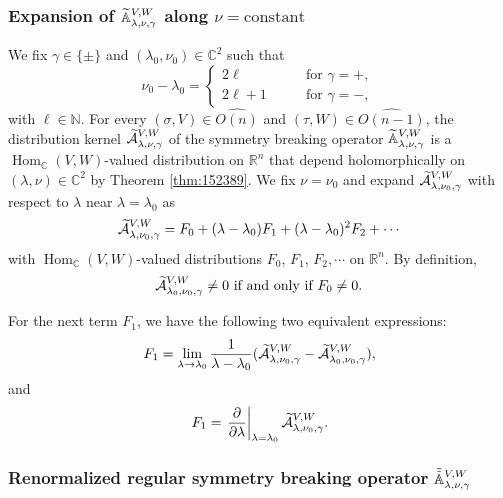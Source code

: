 \subsubsection{Expansion of ${\widetilde{\mathbb{A}}}_{{\lambda},{\nu},{\gamma}}^{{V, W}}$
 along $\nu=\text{constant}$}
\label{subsec:expand}
We fix $\gamma \in \{\pm\}$ and $(\lambda_0, \nu_0)\in {\mathbb{C}}^2$
 such that
\[
  \nu_0 - \lambda_0
  =
  \begin{cases}
  2\ell \qquad &\text{for $\gamma=+$, }
\\
  2\ell+1 \qquad &\text{for $\gamma=-$, }
  \end{cases}
\]
with $\ell \in {\mathbb{N}}$.  
For every $(\sigma, V) \in \widehat{O(n)}$ and $(\tau, W) \in \widehat{O(n-1)}$, the distribution kernel $\widetilde{{\mathcal{A}}}_{{\lambda},{\nu},{\gamma}}^{{V,W}}$
 of the symmetry breaking operator
 ${\widetilde{\mathbb{A}}}_{{\lambda},{\nu},{\gamma}}^{{V,W}}$ is
 a ${\operatorname{Hom}}_{\mathbb{C}}(V,W)$-valued
 distribution on ${\mathbb{R}}^n$
 that depend holomorphically on $(\lambda,\nu) \in {\mathbb{C}}^2$
 by Theorem \ref{thm:152389}.  
We fix $\nu=\nu_0$ and expand $\widetilde{{\mathcal{A}}}_{{\lambda},{\nu_0},{\gamma}}^{{V,W}}$
 with respect to $\lambda$ near $\lambda=\lambda_0$
 as 
\begin{equation}
\label{eqn:Anear0}
   \widetilde{{\mathcal{A}}}_{{\lambda},{\nu_0},{\gamma}}^{{V,W}}
   =
   F_0 + (\lambda-\lambda_0) F_1 + (\lambda-\lambda_0)^2 F_2 + \cdots
\end{equation}
 with ${\operatorname{Hom}}_{\mathbb{C}}(V,W)$-valued
 distributions $F_0$, $F_1$, $F_2, \cdots$
 on ${\mathbb{R}}^n$.  
By definition, 
\[
\text{
$\widetilde{{\mathcal{A}}}_{{\lambda_0},{\nu_0},{\gamma}}^{{V,W}} \ne 0$
 if and only if 
$F_0 \ne 0$.
}
\]



For the next term $F_1$, 
 we have the following two equivalent expressions:
\begin{equation}
\label{eqn:F1}
F_1
=
\lim_{\lambda \to \lambda_0}\frac 1 {\lambda-\lambda_0}
(\widetilde{{\mathcal{A}}}_{{\lambda},{\nu_0},{\gamma}}^{{V,W}} - \widetilde{{\mathcal{A}}}_{{\lambda_0},{\nu_0},{\gamma}}^{{V,W}}), 
\end{equation}
 and 
\begin{equation}
\label{eqn:F2}
F_1
=
\left. \frac{\partial}{\partial \lambda}\right|_{\lambda=\lambda_0}
 \widetilde{{\mathcal{A}}}_{{\lambda},{\nu_0},{\gamma}}^{{V,W}}.  
\end{equation}



\subsubsection{
Renormalized regular symmetry breaking operator
 $\tilde{\tilde{{\mathbb{A}}}}_{{\lambda},{\nu},{\gamma}}^{{V,W}}$}
\label{subsec:AVW}


